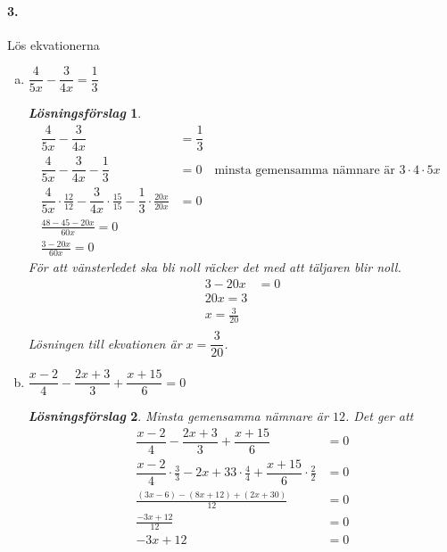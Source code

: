 \documentclass[a4paper]{article}
\newtheorem*{sol}{\normalfont\textit{Lösningsförslag}}
\begin{document}
\paragraph{3.} Lös ekvationerna
\begin{enumerate}[(a)]
\item $\dfrac{4}{5x} - \dfrac{3}{4x} = \dfrac{1}{3}$
  \begin{sol}
    \begin{align*}
      \dfrac{4}{5x} - \dfrac{3}{4x} &= \dfrac{1}{3} \\[1em]
      \dfrac{4}{5x} - \dfrac{3}{4x} - \dfrac{1}{3} &= 0
                                                     \quad
                                                     \text{minsta
                                                     gemensamma
                                                     nämnare är
                                                     $3\cdot 4\cdot 5x$
                                                     }\\[1em]
      \dfrac{4}{5x} \cdot \frac{12}{12}  - \dfrac{3}{4x} \cdot
      \frac{15}{15} - \dfrac{1}{3}\cdot \frac{20x}{20x} &= 0 \\[1em]
      \frac{48-45-20x}{60x} =  0 \\[1em]
      \frac{3-20x}{60x} =  0
    \end{align*}
    För att vänsterledet ska bli noll räcker det med att täljaren blir
    noll.
    \begin{align*}
      3-20x &= 0 \\[1em]
      20x = 3 \\[1em]
      x = \frac{3}{20} \\[1em]
    \end{align*}
    Lösningen till ekvationen är $x = \dfrac{3}{20}$.
  \end{sol}
\item $\dfrac{x-2}{4} - \dfrac{2x+3}{3} + \dfrac{x+15}{6} = 0$
  \begin{sol}
    Minsta gemensamma nämnare är $12$. Det ger att
    \begin{align*}
      \dfrac{x-2}{4} - \dfrac{2x+3}{3} + \dfrac{x+15}{6} &= 0 \\[1em]
      \dfrac{x-2}{4}\cdot \frac{3}{3}-{2x+3}{3}\cdot \frac{4}{4} +
      \dfrac{x+15}{6}\cdot \frac{2}{2} &= 0 \\[1em]
      \frac{(3x-6) - (8x+12) +(2x+30)}{12} &= 0 \\[1em]
      \frac{-3x+12}{12} &= 0 \\[1em]
      -3x+12 &= 0 \\[1em]

\end{align*}
\end{sol}
\end{enumerate}
\end{document}
